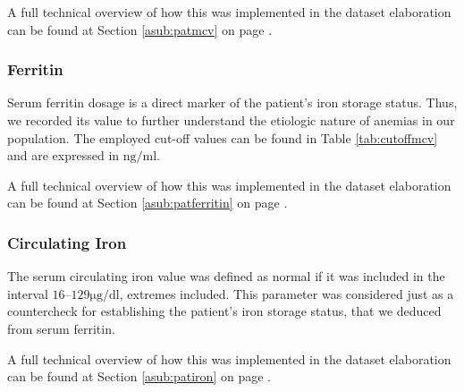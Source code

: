 
A full technical overview of how this was implemented in the dataset elaboration can be found at Section \ref{asub:patmcv} on page \pageref{asub:patmcv}.

\subsubsection{Ferritin}\label{sub:ferritin}
Serum ferritin dosage is a direct marker of the patient's iron storage status. Thus, we recorded its value to further understand the etiologic nature of anemias in our population. The employed cut-off values can be found in Table \ref{tab:cutoffmcv} and are expressed in $\si{\nano\gram/\milli\litre}$.

A full technical overview of how this was implemented in the dataset elaboration can be found at Section \ref{asub:patferritin} on page \pageref{asub:patferritin}.

\subsubsection{Circulating Iron}\label{sub:iron}
The serum circulating iron value was defined as normal if it was included in the interval $16–129 \si{\micro\gram/\deci\litre}$, extremes included. This parameter was considered just as a countercheck for establishing the patient's iron storage status, that we deduced from serum ferritin.

A full technical overview of how this was implemented in the dataset elaboration can be found at Section \ref{asub:patiron} on page \pageref{asub:patiron}.

